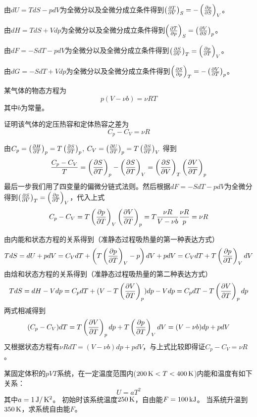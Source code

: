 \documentclass[CJK]{beamer}
\begin{document}
\begin{frame}
  \bch
\bitem
\item{由$dU = TdS - pdV$为全微分以及全微分成立条件得到$\pfrac TVS = -\pfrac pSV$。}
\item{由$dH = TdS + Vdp$为全微分以及全微分成立条件得到$\pfrac TpS = \pfrac VSp$。}
\item{由$dF = -SdT - pdV$为全微分以及全微分成立条件得到$\pfrac SVT = \pfrac pTV$。}
\item{由$dG = -SdT + Vdp$为全微分以及全微分成立条件得到$\pfrac SpT = -\pfrac VTp$。}
\eitem
  \ech
\end{frame}

\begin{frame}
  \chtitle{\proid (\sthree)}
  \bch
某气体的物态方程为
$$p(V-\nu b) = \nu R T$$
其中$b$为常量。

证明该气体的定压热容和定体热容之差为
$$ C_p - C_V = \nu R $$

  \ech
\end{frame}

\begin{frame}
  \bch
由$C_p  =\pfrac HTp = T \pfrac STp$, $C_V = \pfrac UTp = T\pfrac STV$
得到
$$\frac{C_p - C_V}{T} = \pfrac STp - \pfrac STV = \pfrac SVT  \pfrac VTp $$
最后一步我们用了四变量的偏微分链式法则。然后根据$dF = - SdT - pdV$为全微分得到$\pfrac SVT = \pfrac pTV$，代入上式
$$ C_p - C_V = T\pfrac pTV \pfrac VTp = T \frac{\nu R}{V-\nu b} \frac{\nu R}{p} = \nu R$$

  \ech
\end{frame}


\begin{frame}
  \bch
由内能和状态方程的关系得到（准静态过程吸热量的第一种表达方式）
{\scriptsize 
$$ T dS  = dU + pdV = C_V dT + \left(T\pfrac pTV -p\right)dV+pdV = C_V dT + T\pfrac pTV dV  $$}
由焓和状态方程的关系得到（准静态过程吸热量的第二种表达方式）
{\scriptsize 
$$ TdS = dH - Vdp = C_p dT + (V-T\pfrac VTp)dp - Vdp = C_p dT - T\pfrac VTp dp$$}
两式相减得到
$$ (C_p- C_V)dT =  T\pfrac VTp dp + T\pfrac pTV dV = (V-\nu b)dp + p dV $$
又根据状态方程有$ \nu R dT = (V-\nu b) dp + p dV$，与上式比较即得证$C_p - C_V = \nu R$。
  \ech
\end{frame}


\begin{frame}
  \chtitle{\proid (\sthree)}
  \bch
某固定体积的$pVT$系统，在一定温度范围内($200\SIK < T< 400 \SIK$)内能和温度有如下关系：
  $$U =  aT^2 $$
  其中$a=1 \SIJ/\SIK^2$。
  初始时该系统温度$250\SIK$，自由能$F = 100 \SIkJ$。
  当系统升温到$350\SIK$，求系统自由能$F$。
  \ech
\end{frame}
\end{document}
